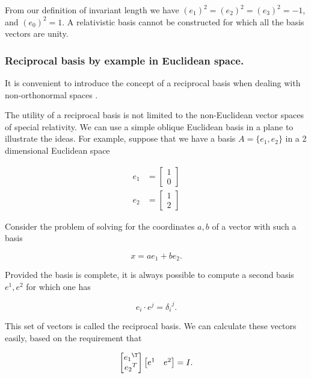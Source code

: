 \documentclass[iop,tighten]{emulateapj}
\begin{document}
From our definition of invariant length we have $(e_1)^2 = (e_2)^2 = (e_3)^2 = -1$, and $(e_0)^2 = 1$.  A relativistic basis cannot be constructed for which all the basis vectors are unity.

\subsubsection{Reciprocal basis by example in Euclidean space.}

It is convenient to introduce the concept of a reciprocal basis when dealing with non-orthonormal spaces \citep{doran2003gap}.

The utility of a reciprocal basis is not limited to the non-Euclidean vector spaces of special relativity.  We can use a simple oblique Euclidean basis in a plane to illustrate the ideas.  For example, suppose that we have a basis $A = \{e_1, e_2\}$ in a 2 dimensional Euclidean space

\begin{equation}\label{eqn:grahamSchmidtLorentz:90}
\begin{aligned}
e_1 &= 
\begin{bmatrix}
1 \\
0
\end{bmatrix} \\
e_2 &= 
\begin{bmatrix}
1 \\
2
\end{bmatrix} 
\end{aligned}
\end{equation}

Consider the problem of solving for the coordinates $a,b$ of a vector with such a basis

\begin{equation}\label{eqn:grahamSchmidtLorentz:110}
x = a e_1 + b e_2.
\end{equation}

Provided the basis is complete, it is always possible to compute a second basis ${e^1, e^2}$ for which one has

\begin{equation}\label{eqn:grahamSchmidtLorentz:130}
e_i \cdot e^j = {\delta_i}^j.
\end{equation}

This set of vectors is called the reciprocal basis.  We can calculate these vectors easily, based on the requirement that

\begin{equation}\label{eqn:grahamSchmidtLorentz:150}
\begin{bmatrix}
{e_1}^\T \\
{e_2}^T
\end{bmatrix}
\begin{bmatrix}
e^1 & e^2
\end{bmatrix} = I.
\end{equation}
\end{document}
